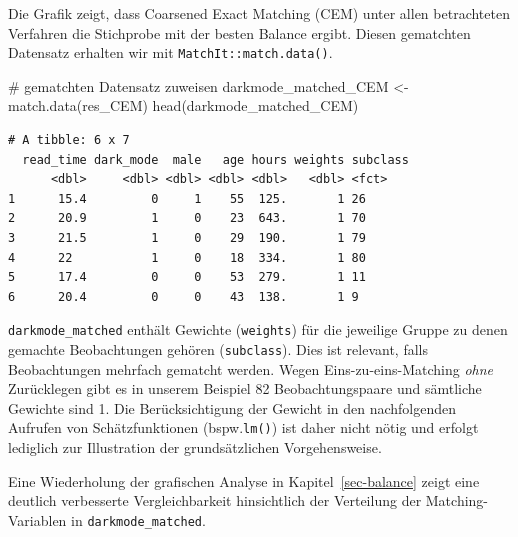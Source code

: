 \documentclass[
  a4paper,
  DIV=11,
  oneside]{scrreprt}
\newenvironment{Shaded}{\begin{snugshade}}{\end{snugshade}}
\newcommand{\CommentTok}[1]{\textcolor[rgb]{0.37,0.37,0.37}{#1}}
\newcommand{\FunctionTok}[1]{\textcolor[rgb]{0.28,0.35,0.67}{#1}}
\newcommand{\NormalTok}[1]{\textcolor[rgb]{0.00,0.23,0.31}{#1}}
\newcommand{\OtherTok}[1]{\textcolor[rgb]{0.00,0.23,0.31}{#1}}
\begin{document}
Die Grafik zeigt, dass Coarsened Exact Matching (CEM) unter allen
betrachteten Verfahren die Stichprobe mit der besten Balance ergibt.
Diesen gematchten Datensatz erhalten wir mit
\texttt{MatchIt::match.data()}.

\begin{Shaded}
\begin{Highlighting}[]
\CommentTok{\# gematchten Datensatz zuweisen}
\NormalTok{darkmode\_matched\_CEM }\OtherTok{\textless{}{-}} \FunctionTok{match.data}\NormalTok{(res\_CEM)}
\FunctionTok{head}\NormalTok{(darkmode\_matched\_CEM)}
\end{Highlighting}
\end{Shaded}

\begin{verbatim}
# A tibble: 6 x 7
  read_time dark_mode  male   age hours weights subclass
      <dbl>     <dbl> <dbl> <dbl> <dbl>   <dbl> <fct>   
1      15.4         0     1    55  125.       1 26      
2      20.9         1     0    23  643.       1 70      
3      21.5         1     0    29  190.       1 79      
4      22           1     0    18  334.       1 80      
5      17.4         0     0    53  279.       1 11      
6      20.4         0     0    43  138.       1 9       
\end{verbatim}

\texttt{darkmode\_matched} enthält Gewichte (\texttt{weights}) für die
jeweilige Gruppe zu denen gemachte Beobachtungen gehören
(\texttt{subclass}). Dies ist relevant, falls Beobachtungen mehrfach
gematcht werden. Wegen Eins-zu-eins-Matching \emph{ohne} Zurücklegen
gibt es in unserem Beispiel 82 Beobachtungspaare und sämtliche Gewichte
sind 1. Die Berücksichtigung der Gewicht in den nachfolgenden Aufrufen
von Schätzfunktionen (bspw.\texttt{lm()}) ist daher nicht nötig und
erfolgt lediglich zur Illustration der grundsätzlichen Vorgehensweise.

Eine Wiederholung der grafischen Analyse in Kapitel~\ref{sec-balance}
zeigt eine deutlich verbesserte Vergleichbarkeit hinsichtlich der
Verteilung der Matching-Variablen in \texttt{darkmode\_matched}.
\end{document}
